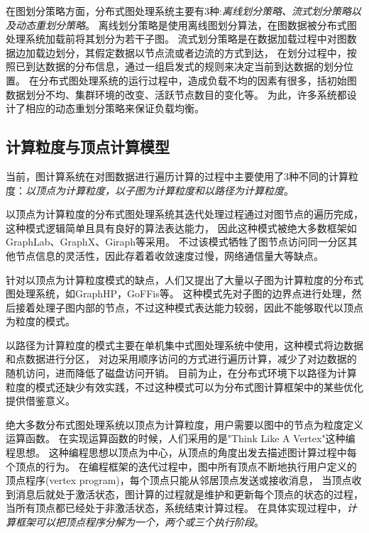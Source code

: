 在图划分策略方面，分布式图处理系统主要有3种:\textit{离线划分策略、流式划分策略以及动态重划分策略}。
离线划分策略是使用离线图划分算法，在图数据被分布式图处理系统加载前将其划分为若干子图。
流式划分策略是在数据加载过程中对图数据边加载边划分，其假定数据以节点流或者边流的方式到达，
在划分过程中，按照已到达数据的分布信息，通过一组启发式的规则来决定当前到达数据的划分位置。
在分布式图处理系统的运行过程中，造成负载不均的因素有很多，括初始图数据划分不均、集群环境的改变、活跃节点数目的变化等。
为此，许多系统都设计了相应的动态重划分策略来保证负载均衡。

\subsection{计算粒度与顶点计算模型}

当前，图计算系统在对图数据进行遍历计算的过程中主要使用了3种不同的计算粒度：\textit{以顶点为计算粒度，以子图为计算粒度和以路径为计算粒度}。
    
以顶点为计算粒度的分布式图处理系统其迭代处理过程通过对图节点的遍历完成，这种模式逻辑简单且具有良好的算法表达能力，
因此这种模式被绝大多数框架如GraphLab\cite{Low@12}、GraphX\cite{Gonzalez@OSDI14}、Giraph\cite{Avery@HS11}等采用。
不过该模式牺牲了图节点访问同一分区其他节点信息的灵活性，因此存着着收敛速度过慢，网络通信量大等缺点。

针对以顶点为计算粒度模式的缺点，人们又提出了大量以子图为计算粒度的分布式图处理系统，如GraphHP，GoFFis等。
这种模式先对子图的边界点进行处理，然后接着处理子图内部的节点，不过这种模式表达能力较弱，因此不能够取代以顶点为粒度的模式。

以路径为计算粒度的模式主要在单机集中式图处理系统中使用，这种模式将边数据和点数据进行分区，
对边采用顺序访问的方式进行遍历计算，减少了对边数据的随机访问，进而降低了磁盘访问开销。
目前为止，在分布式环境下以路径为计算粒度的模式还缺少有效实践，不过这种模式可以为分布式图计算框架中的某些优化提供借鉴意义。

绝大多数分布式图处理系统以顶点为计算粒度，用户需要以图中的节点为粒度定义运算函数。
在实现运算函数的时候，人们采用的是"Think Like A Vertex"\cite{TLV}这种编程思想。
这种编程思想以顶点为中心，从顶点的角度出发去描述图计算过程中每个顶点的行为。
在编程框架的迭代过程中，图中所有顶点不断地执行用户定义的顶点程序(vertex program)，每个顶点只能从邻居顶点发送或接收消息，
当顶点收到消息后就处于激活状态，图计算的过程就是维护和更新每个顶点的状态的过程，当所有顶点都已经处于非激活状态，系统结束计算过程。
在具体实现过程中，\textit{计算框架可以把顶点程序分解为一个，两个或三个执行阶段}。

